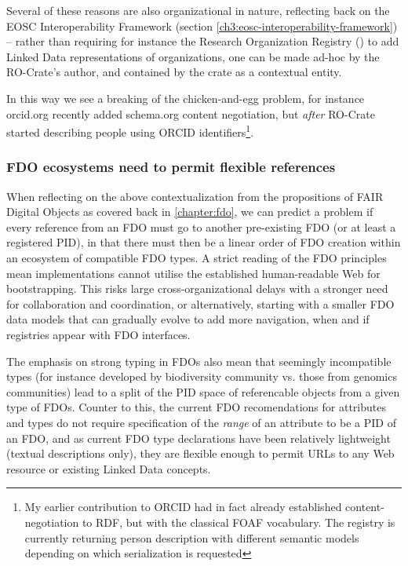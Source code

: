 Several of these reasons are also organizational in nature, reflecting back on the EOSC Interoperability Framework (section \vref{ch3:eosc-interoperability-framework}) -- rather than requiring for instance the Research Organization Registry () to add Linked Data representations of organizations, one can be made ad-hoc by the RO-Crate's author, and contained by the crate as a contextual entity. 

In this way we see a breaking of the chicken-and-egg problem, for instance orcid.org recently added schema.org content negotiation, but \emph{after} RO-Crate started describing people using ORCID identifiers\footnote{My earlier contribution to ORCID had in fact already established content-negotiation to RDF, but with the classical FOAF vocabulary. The registry is 
currently returning person description with different semantic models depending on which serialization is requested}. 


\subsubsection{FDO ecosystems need to permit flexible references}

When reflecting on the above contextualization from the propositions of FAIR Digital Objects as covered back in \ref{chapter:fdo}, we can predict a problem if every reference from an FDO must go to another pre-existing FDO (or at least a registered PID), in that there must then be a linear order of FDO creation within an ecosystem of compatible FDO types. A strict reading of the FDO principles mean implementations cannot utilise the established human-readable Web for bootstrapping. This risks large cross-organizational delays with a stronger need for collaboration and coordination, or alternatively, starting with a smaller FDO data models that can gradually evolve to add more navigation, when and if registries appear with FDO interfaces. 

The emphasis on strong typing in FDOs also mean that seemingly incompatible types (for instance developed by biodiversity community vs. those from genomics communities) lead to a split of the PID space of referencable objects from a given type of FDOs.  Counter to this, the current FDO recomendations for attributes and types \cite{fdo-ImplAttributesTypesProfiles} do not require specification of the \emph{range} of an attribute to be a PID of an FDO, and as current FDO type declarations have been relatively lightweight (textual descriptions only), they are flexible enough to permit URLs to any Web resource or existing Linked Data concepts.  

